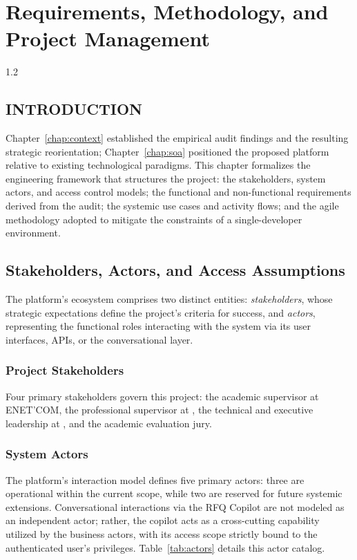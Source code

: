 \chapter{Requirements, Methodology, and Project Management}\label{chap:requirements}
\begin{spacing}{1.2}
\minitoc
\thispagestyle{MyStyle}
\end{spacing}
\newpage

\section*{INTRODUCTION}
Chapter~\ref{chap:context} established the empirical audit findings and the resulting strategic reorientation; Chapter~\ref{chap:soa} positioned the proposed platform relative to existing technological paradigms. This chapter formalizes the engineering framework that structures the project: the stakeholders, system actors, and access control models; the functional and non-functional requirements derived from the audit; the systemic use cases and activity flows; and the agile methodology adopted to mitigate the constraints of a single-developer environment.

\section{Stakeholders, Actors, and Access Assumptions}\label{sec:stakeholders_actors}
The platform's ecosystem comprises two distinct entities: \textit{stakeholders}, whose strategic expectations define the project's criteria for success, and \textit{actors}, representing the functional roles interacting with the system via its user interfaces, APIs, or the conversational layer.

\subsection{Project Stakeholders}
Four primary stakeholders govern this project: the academic supervisor at ENET'COM, the professional supervisor at \hostCompany, the technical and executive leadership at \clientCompany, and the academic evaluation jury.

\subsection{System Actors}
The platform's interaction model defines five primary actors: three are operational within the current scope, while two are reserved for future systemic extensions. Conversational interactions via the RFQ Copilot are not modeled as an independent actor; rather, the copilot acts as a cross-cutting capability utilized by the business actors, with its access scope strictly bound to the authenticated user's privileges. Table~\ref{tab:actors} details this actor catalog.

